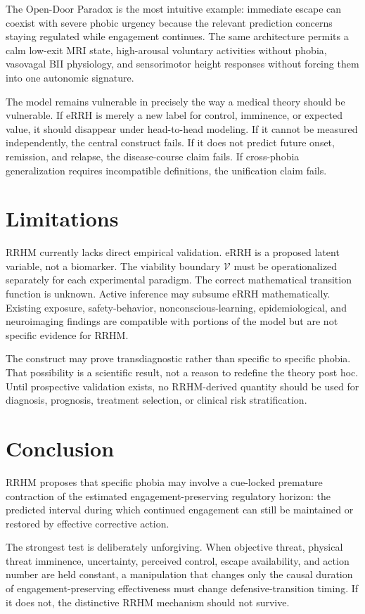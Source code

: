 \documentclass[9pt,twocolumn]{article}
\begin{document}
The Open-Door Paradox is the most intuitive example: immediate escape can coexist with severe phobic urgency because the relevant prediction concerns staying regulated while engagement continues. The same architecture permits a calm low-exit MRI state, high-arousal voluntary activities without phobia, vasovagal BII physiology, and sensorimotor height responses without forcing them into one autonomic signature.

The model remains vulnerable in precisely the way a medical theory should be vulnerable. If eRRH is merely a new label for control, imminence, or expected value, it should disappear under head-to-head modeling. If it cannot be measured independently, the central construct fails. If it does not predict future onset, remission, and relapse, the disease-course claim fails. If cross-phobia generalization requires incompatible definitions, the unification claim fails.

\section{Limitations}
RRHM currently lacks direct empirical validation. eRRH is a proposed latent variable, not a biomarker. The viability boundary $\mathcal V$ must be operationalized separately for each experimental paradigm. The correct mathematical transition function is unknown. Active inference may subsume eRRH mathematically. Existing exposure, safety-behavior, nonconscious-learning, epidemiological, and neuroimaging findings are compatible with portions of the model but are not specific evidence for RRHM.

The construct may prove transdiagnostic rather than specific to specific phobia. That possibility is a scientific result, not a reason to redefine the theory post hoc. Until prospective validation exists, no RRHM-derived quantity should be used for diagnosis, prognosis, treatment selection, or clinical risk stratification.

\section{Conclusion}
RRHM proposes that specific phobia may involve a cue-locked premature contraction of the estimated engagement-preserving regulatory horizon: the predicted interval during which continued engagement can still be maintained or restored by effective corrective action.

The strongest test is deliberately unforgiving. When objective threat, physical threat imminence, uncertainty, perceived control, escape availability, and action number are held constant, a manipulation that changes only the causal duration of engagement-preserving effectiveness must change defensive-transition timing. If it does not, the distinctive RRHM mechanism should not survive.
\end{document}
